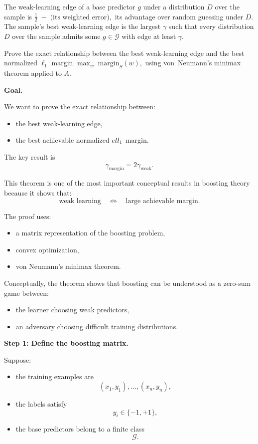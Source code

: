\documentclass[11pt]{article}
\begin{document}
\begin{enumerate}
The weak-learning edge of a base predictor $g$ under a distribution $D$ over the sample is 
$
\frac{1}{2} \;-\; \text{(its weighted error)},
$
its advantage over random guessing under $D$.  
The sample's best weak-learning edge is the largest $\gamma$ such that every distribution 
$D$ over the sample admits some $g \in \mathcal{G}$ with edge at least $\gamma$.

Prove the exact relationship between the best weak-learning edge and the best normalized 
$\ell_1$ margin
$
\max_w \; \mathrm{margin}_S(w),
$
using von~Neumann's minimax theorem applied to $A$.


\begin{solutionbox}
\textbf{Goal.}

We want to prove the exact relationship between:
\begin{itemize}
    \item the best weak-learning edge,
    \item the best achievable normalized $\\ell_1$ margin.
\end{itemize}

The key result is
\[
\boxed{
\gamma_{\mathrm{margin}}
=
2\gamma_{\mathrm{weak}}.
}
\]

This theorem is one of the most important conceptual results in boosting theory because it shows that:
\[
\text{weak learning}
\quad\Longleftrightarrow\quad
\text{large achievable margin}.
\]

The proof uses:
\begin{itemize}
    \item a matrix representation of the boosting problem,
    \item convex optimization,
    \item von Neumann's minimax theorem.
\end{itemize}

Conceptually, the theorem shows that boosting can be understood as a zero-sum game between:
\begin{itemize}
    \item the learner choosing weak predictors,
    \item an adversary choosing difficult training distributions.
\end{itemize}

\medskip

\textbf{Step 1: Define the boosting matrix.}

Suppose:
\begin{itemize}
    \item the training examples are
    \[
    (x_1,y_1),\ldots,(x_n,y_n),
    \]
    \item the labels satisfy
    \[
    y_i\in\{-1,+1\},
    \]
    \item the base predictors belong to a finite class
    \[
    \mathcal G.
    \]
\end{itemize}


\end{solutionbox}
\end{enumerate}
\end{document}
